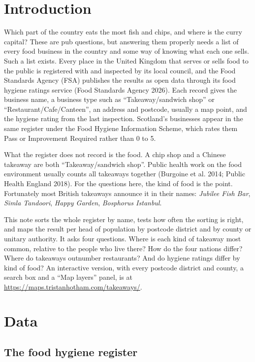 \documentclass[11pt,a4paper]{article}
\begin{document}
\section{Introduction}

Which part of the country eats the most fish and chips, and where is the curry capital? These are pub questions, but answering them properly needs a list of every food business in the country and some way of knowing what each one sells. Such a list exists. Every place in the United Kingdom that serves or sells food to the public is registered with and inspected by its local council, and the Food Standards Agency (FSA) publishes the results as open data through its food hygiene ratings service (Food Standards Agency 2026). Each record gives the business name, a business type such as ``Takeaway/sandwich shop'' or ``Restaurant/Cafe/Canteen'', an address and postcode, usually a map point, and the hygiene rating from the last inspection. Scotland's businesses appear in the same register under the Food Hygiene Information Scheme, which rates them Pass or Improvement Required rather than 0 to 5.

What the register does not record is the food. A chip shop and a Chinese takeaway are both ``Takeaway/sandwich shop''. Public health work on the food environment usually counts all takeaways together (Burgoine et al. 2014; Public Health England 2018). For the questions here, the kind of food is the point. Fortunately most British takeaways announce it in their names: \textit{Jubilee Fish Bar}, \textit{Simla Tandoori}, \textit{Happy Garden}, \textit{Bosphorus Istanbul}.

This note sorts the whole register by name, tests how often the sorting is right, and maps the result per head of population by postcode district and by county or unitary authority. It asks four questions. Where is each kind of takeaway most common, relative to the people who live there? How do the four nations differ? Where do takeaways outnumber restaurants? And do hygiene ratings differ by kind of food? An interactive version, with every postcode district and county, a search box and a ``Map layers'' panel, is at \url{https://maps.tristanhotham.com/takeaways/}.

\section{Data}

\subsection{The food hygiene register}
\end{document}
